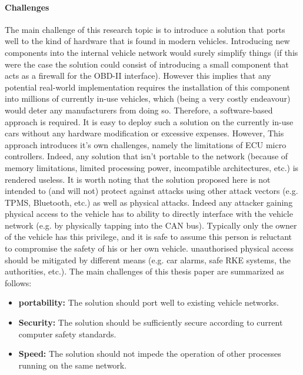 \documentclass[11pt]{article}
\begin{document}
\paragraph{Challenges} \label{Challenges}
The main challenge of this research topic is to introduce a solution that ports well to the kind of hardware that is found in modern vehicles. Introducing new components into the internal vehicle network would surely simplify things (if this were the case the solution could consist of introducing a small component that acts as a firewall for the OBD-II interface). However this implies that any potential real-world implementation requires the installation of this component into millions of currently in-use vehicles, which (being a very costly endeavour) would deter any manufacturers from doing so. Therefore, a software-based approach is required. It is easy to deploy such a solution on the currently in-use cars without any hardware modification or excessive expenses. However, This approach introduces it's own challenges, namely the limitations of ECU micro controllers. Indeed, any solution that isn't portable to the network (because of memory limitations, limited processing power, incompatible architectures, etc.) is rendered useless. It is worth noting that the solution proposed here is not intended to (and will not) protect against attacks using other attack vectors (e.g. TPMS, Bluetooth, etc.) as well as physical attacks. Indeed any attacker gaining physical access to the vehicle has to ability to directly interface with the vehicle network (e.g. by physically tapping into the CAN bus). Typically only the owner of the vehicle has this privilege, and it is safe to assume this person is reluctant to compromise the safety of his or her own vehicle. unauthorised physical access should be mitigated by different means (e.g. car alarms, safe RKE systems, the authorities, etc.). The main challenges of this thesis paper are summarized as follows:

\begin{itemize}
	\item \textbf{portability:} The solution should port well to existing vehicle networks. 
	\item \textbf{Security:} The solution should be sufficiently secure according to current computer safety standards. 
	\item \textbf{Speed:} The solution should not impede the operation of other processes running on the same network.
\end{itemize}
\end{document}
